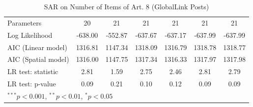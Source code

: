 \begin{table}[!h]
\begin{center}
\begin{tabular}{l c c c c c c }
Parameters              & 20           & 21           & 21           & 21           & 21           & 21           \\
Log Likelihood          & -638.00      & -552.87      & -637.67      & -637.17      & -637.99      & -637.99      \\
AIC (Linear model)      & 1316.81      & 1147.34      & 1318.09      & 1316.79      & 1318.78      & 1318.77      \\
AIC (Spatial model)     & 1316.00      & 1147.75      & 1317.34      & 1316.33      & 1317.97      & 1317.98      \\
LR test: statistic      & 2.81         & 1.59         & 2.75         & 2.46         & 2.81         & 2.79         \\
LR test: p-value        & 0.09         & 0.21         & 0.10         & 0.12         & 0.09         & 0.09         \\
\bottomrule
\multicolumn{7}{l}{\scriptsize{$^{***}p<0.001$, $^{**}p<0.01$, $^*p<0.05$}}
\end{tabular}
\caption{SAR on Number of Items of Art. 8 (GlobalLink Posts)}
\label{table:coefficients}
\end{center}
\end{table}
